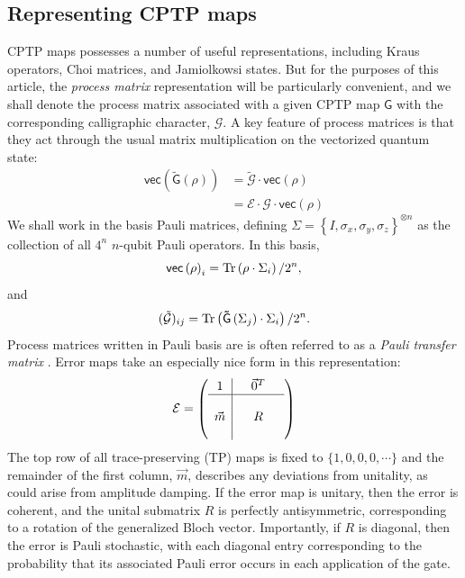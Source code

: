 \documentclass[aps,nofootinbib,pra,notitlepage,twocolumn]{revtex4-1}
\newcommand{\tr}{{\rm Tr\thinspace}}
\newcommand{\vectorize}[1]{\ensuremath{\mathsf{vec}\left(#1\right)}}
\begin{document}
\subsection{Representing CPTP maps}
\noindent CPTP maps possesses a number of useful representations, including Kraus operators\cite{1983}, Choi matrices\cite{Choi1975}, and Jamiolkowsi states\cite{yczkowski2004}. But for the purposes of this article, the \emph{process matrix} representation will be particularly convenient\cite{OBrien2004}, and we shall denote the process matrix associated with a given CPTP map $\mathsf{G}$ with the corresponding calligraphic character, $\mathcal{G}$. A key feature of process matrices is that they act through the usual matrix multiplication on the vectorized quantum state:
\begin{align}
	\vectorize{\mathsf{\tilde G}(\rho)}
		&= \mathcal{\tilde G}\cdot\vectorize{\rho} \\
		&= \mathcal{E}\cdot\mathcal{G}\cdot\vectorize{\rho}
\end{align}
We shall work in the basis Pauli matrices, defining $\Sigma = \left\{I, \sigma_x, \sigma_y, \sigma_z\right\}^{\otimes n}$ as the collection of all $4^n$ $n$-qubit Pauli operators.  In this basis,
\begin{equation}
  \vectorize{\rho}_i = \tr\!\left(\rho \cdot\Sigma_i\right)/2^n,
\end{equation}
and
\begin{equation}
	(\mathcal{\tilde G})_{ij} = \tr\!\left(\mathsf{\tilde G}\left(\Sigma_j\right) \cdot\Sigma_i\right)/2^n.
\end{equation}
Process matrices written in Pauli basis are is often referred to as a \emph{Pauli transfer matrix} \cite{Chow2012}. Error maps take an especially nice form in this representation:
\begin{equation}\label{eq:process_matrix}
\mathcal{E} =
	\left(\begin{array}{c|cccc}
		1 &  & \vec{0}^T & \\ 
		\hline & &  &  \\
		\vec{m} &  & R &  \\
		 &  &  & 
	\end{array} 	
	\right)
\end{equation}
The top row of all trace-preserving (TP) maps is fixed to $\{1,0,0,0,\cdots\}$ and the remainder of the first column, $\vec{m}$, describes any deviations from unitality, as could arise from amplitude damping. If the error map is unitary, then the error is coherent, and the unital submatrix $R$ is perfectly antisymmetric, corresponding to a rotation of the generalized Bloch vector. Importantly, if $R$ is diagonal, then the error  is Pauli stochastic, with each diagonal entry corresponding to the probability that its associated Pauli error occurs in each application of the gate. 
\end{document}
